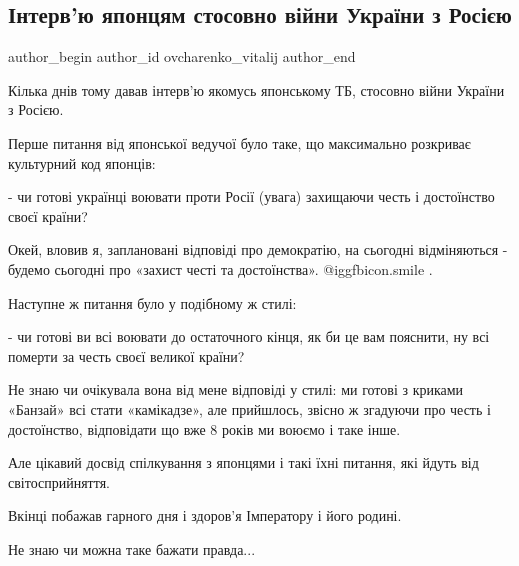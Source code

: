  
 
 
 
 
 
\subsection{Інтерв'ю японцям стосовно війни України з Росією}
\label{sec:15_01_2022.fb.ovcharenko_vitalij.1.japonia_interview_ukr_rossia}
 
\ifcmt
 author_begin
   author_id ovcharenko_vitalij
 author_end
\fi

Кілька днів тому давав інтерв’ю якомусь японському ТБ, стосовно війни України з
Росією.


Перше питання від японської ведучої було таке, що максимально розкриває
культурний код японців:

- чи готові українці воювати проти Росії (увага) захищаючи честь і достоїнство
своєї країни?

Окей, вловив я, заплановані відповіді про демократію, на сьогодні відміняються
- будемо сьогодні про «захист честі та достоїнства».  @igg{fbicon.smile} .

Наступне ж питання було у подібному ж стилі: 

- чи готові ви всі воювати до остаточного кінця, як би це вам пояснити, ну всі
померти за честь своєї великої країни?

Не знаю чи очікувала вона від мене відповіді у стилі: ми готові з криками
«Банзай» всі стати «камікадзе», але прийшлось, звісно ж згадуючи про честь і
достоїнство, відповідати що вже 8 років ми воюємо і таке інше.

Але цікавий досвід спілкування з японцями і такі їхні питання, які йдуть від
світосприйняття.

Вкінці побажав гарного дня і здоров’я Імператору і його родині. 

Не знаю чи можна таке бажати правда...

